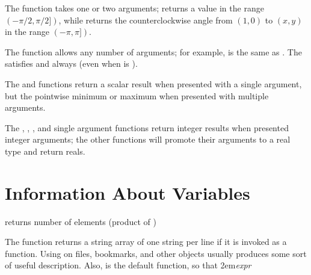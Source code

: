 The  function takes one or two arguments; 
returns a value in the range $(-\pi/2,\pi/2])$, while 
returns the counterclockwise angle from $(1,0)$ to $(x,y)$ in the
range $(-\pi,\pi])$.

The  function allows any number of arguments; for example,
 is the same as .
The  satisfies  and 
always (even when  is ).

The  and  functions return a scalar result when
presented with a single argument, but the pointwise minimum or maximum
when presented with multiple arguments.

The , , , and single argument 
functions return integer results when presented integer arguments; the
other functions will promote their arguments to a real type and return
reals.

\section{Information About Variables}

     {returns number of elements (product of )}


The  function returns a string array of one string per line if
it is invoked as a function.  Using  on files, bookmarks, and
other objects usually produces some sort of useful description.  Also,
 is the default function, so that
\begindemo
\hglue2em{\it expr}
\enddemo

